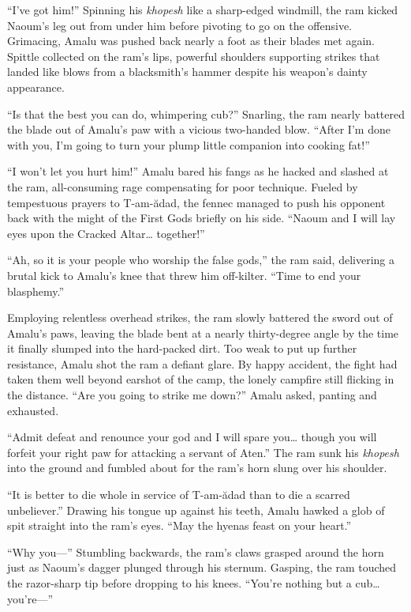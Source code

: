 ``I've got him!'' Spinning his \emph{khopesh} like a sharp-edged windmill, the ram kicked Naoum's leg out from under him before pivoting to go on the offensive. Grimacing, Amalu was pushed back nearly a foot as their blades met again. Spittle collected on the ram's lips, powerful shoulders supporting strikes that landed like blows from a blacksmith's hammer despite his weapon's dainty appearance.

``Is that the best you can do, whimpering cub?'' Snarling, the ram nearly battered the blade out of Amalu's paw with a vicious two-handed blow. ``After I'm done with you, I'm going to turn your plump little companion into cooking fat!''

``I won't let you hurt him!'' Amalu bared his fangs as he hacked and slashed at the ram, all-consuming rage compensating for poor technique. Fueled by tempestuous prayers to T-am-ădad, the fennec managed to push his opponent back with the might of the First Gods briefly on his side. ``Naoum and I will lay eyes upon the Cracked Altar\ldots{} together!''

``Ah, so it is your people who worship the false gods,'' the ram said, delivering a brutal kick to Amalu's knee that threw him off-kilter. ``Time to end your blasphemy.''

Employing relentless overhead strikes, the ram slowly battered the sword out of Amalu's paws, leaving the blade bent at a nearly thirty-degree angle by the time it finally slumped into the hard-packed dirt. Too weak to put up further resistance, Amalu shot the ram a defiant glare. By happy accident, the fight had taken them well beyond earshot of the camp, the lonely campfire still flicking in the distance. ``Are you going to strike me down?'' Amalu asked, panting and exhausted.

``Admit defeat and renounce your god and I will spare you\ldots{} though you will forfeit your right paw for attacking a servant of Aten.'' The ram sunk his \emph{khopesh} into the ground and fumbled about for the ram's horn slung over his shoulder.

``It is better to die whole in service of T-am-ădad than to die a scarred unbeliever.'' Drawing his tongue up against his teeth, Amalu hawked a glob of spit straight into the ram's eyes. ``May the hyenas feast on your heart.''

``Why you---'' Stumbling backwards, the ram's claws grasped around the horn just as Naoum's dagger plunged through his sternum. Gasping, the ram touched the razor-sharp tip before dropping to his knees. ``You're nothing but a cub\ldots{} you're---''

